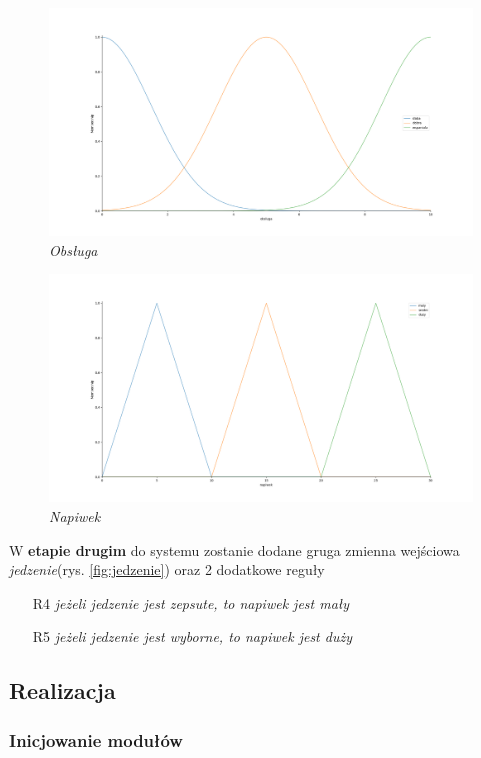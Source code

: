 \documentclass[a4paper, 10pt]{article}
\begin{document}
\begin{figure}[H]
	\centering
	\includegraphics[scale=0.25]{Figure_1.png}
	\caption{\textit{Obsługa}}
	\label{fig:obsluga}
\end{figure}

\begin{figure}[H]
	\centering
	\includegraphics[scale=0.25]{Figure_2.png}
	\caption{\textit{Napiwek}}
	\label{fig:napiwek}
\end{figure}

W \textbf{etapie drugim} do systemu zostanie dodane gruga zmienna wejściowa \emph{jedzenie}(rys. \ref{fig:jedzenie}) oraz 2 dodatkowe reguły
\begin{itemize}
	\item[R4] \emph{jeżeli jedzenie jest zepsute, to napiwek jest mały}
	\item[R5] \emph{jeżeli jedzenie jest wyborne, to napiwek jest duży}
\end{itemize}


\subsection{Realizacja}
\subsubsection{Inicjowanie modułów}\label{p1}
\end{document}
